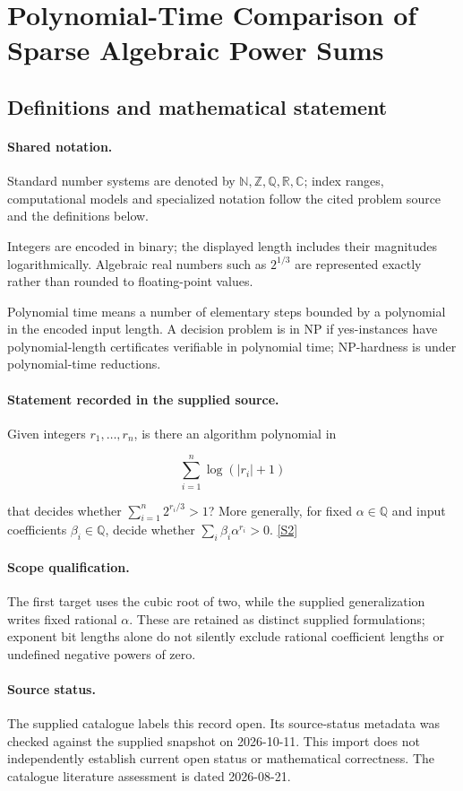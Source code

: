 \documentclass[11pt]{article}
\newcommand{\sref}[2]{\hyperlink{source:#1:#2}{[S#2]}}
\begin{document}
\section{Polynomial-Time Comparison of Sparse Algebraic Power Sums}\label{statement}

\subsection{Definitions and mathematical statement}

\paragraph{Shared notation.}Standard number systems are denoted by $\mathbb N,\mathbb Z,\mathbb Q,\mathbb R,\mathbb C$; index ranges, computational models and specialized notation follow the cited problem source and the definitions below.


Integers are encoded in binary; the displayed length includes their magnitudes logarithmically. Algebraic real numbers such as $2^{1/3}$ are represented exactly rather than rounded to floating-point values.

Polynomial time means a number of elementary steps bounded by a polynomial in the encoded input length. A decision problem is in $\mathrm{NP}$ if yes-instances have polynomial-length certificates verifiable in polynomial time; NP-hardness is under polynomial-time reductions.
\paragraph{Statement recorded in the supplied source.}
Given integers $r_1,\ldots,r_n$, is there an algorithm polynomial in

$$\sum_{i=1}^n\log(\lvert r_i\rvert+1)$$

that decides whether $\sum_{i=1}^n2^{r_i/3}>1$? More generally, for fixed $\alpha\in\mathbb Q$ and input coefficients $\beta_i\in\mathbb Q$, decide whether $\sum_i\beta_i\alpha^{r_i}>0$. \sref{statement}{2}
\paragraph{Scope qualification.}
The first target uses the cubic root of two, while the supplied generalization writes fixed rational $\alpha$. These are retained as distinct supplied formulations; exponent bit lengths alone do not silently exclude rational coefficient lengths or undefined negative powers of zero.
\paragraph{Source status.}
The supplied catalogue labels this record open. Its source-status metadata was checked against the supplied snapshot on 2026-10-11. This import does not independently establish current open status or mathematical correctness. The catalogue literature assessment is dated 2026-08-21.
\end{document}
